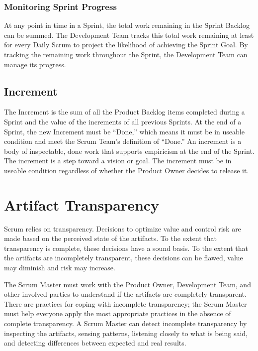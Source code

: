 \subsubsection{Monitoring Sprint Progress}
At any point in time in a Sprint, the total work remaining in the Sprint Backlog can be summed.
The Development Team tracks this total work remaining at least for every Daily Scrum to project
the likelihood of achieving the Sprint Goal. By tracking the remaining work throughout the
Sprint, the Development Team can manage its progress.

\subsection{Increment}
The Increment is the sum of all the Product Backlog items completed during a Sprint and the
value of the increments of all previous Sprints. At the end of a Sprint, the new Increment must
be ``Done,'' which means it must be in useable condition and meet the Scrum Team's definition
of ``Done.'' An increment is a body of inspectable, done work that supports empiricism at the
end of the Sprint. The increment is a step toward a vision or goal. The increment must be in
useable condition regardless of whether the Product Owner decides to release it.

\section{Artifact Transparency}
Scrum relies on transparency. Decisions to optimize value and control risk are made based on
the perceived state of the artifacts. To the extent that transparency is complete, these decisions
have a sound basis. To the extent that the artifacts are incompletely transparent, these
decisions can be flawed, value may diminish and risk may increase.

The Scrum Master must work with the Product Owner, Development Team, and other involved
parties to understand if the artifacts are completely transparent. There are practices for coping
with incomplete transparency; the Scrum Master must help everyone apply the most
appropriate practices in the absence of complete transparency. A Scrum Master can detect
incomplete transparency by inspecting the artifacts, sensing patterns, listening closely to what is
being said, and detecting differences between expected and real results.

